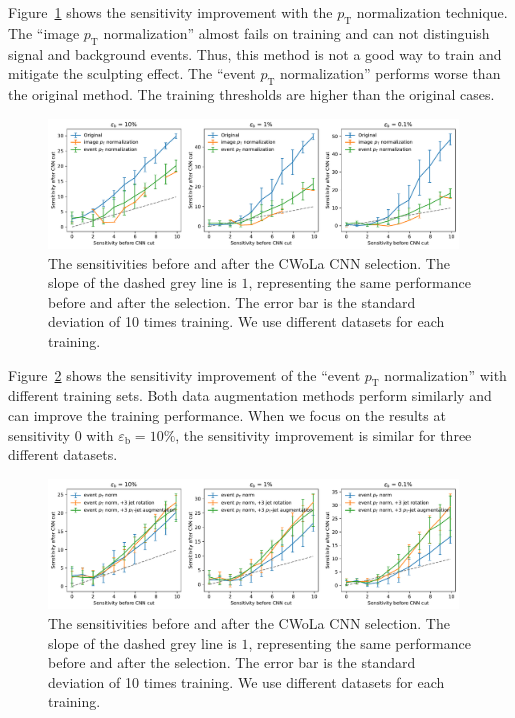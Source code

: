 \documentclass[12pt]{article}
\begin{document}
			 Figure~\ref{fig:sensitivity_improvement_background_subtraction_origin_pt_normalized} shows the sensitivity improvement with the $p_{\text{T}}$ normalization technique. The ``image $p_{\text{T}}$ normalization'' almost fails on training and can not distinguish signal and background events. Thus, this method is not a good way to train and mitigate the sculpting effect. The ``event $p_{\text{T}}$ normalization'' performs worse than the original method. The training thresholds are higher than the original cases.
			\begin{figure}[htpb]
				\centering
				\includegraphics[width=0.97\textwidth]{HVmodel_sensitivity_improvement_origin_pT_normalied.pdf}
				\caption{The sensitivities before and after the CWoLa CNN selection. The slope of the dashed grey line is $1$, representing the same performance before and after the selection. The error bar is the standard deviation of 10 times training. We use different datasets for each training.}
				\label{fig:sensitivity_improvement_background_subtraction_origin_pt_normalized}
			\end{figure}

			Figure~\ref{fig:sensitivity_improvement_background_subtraction_event_pt_normalized_origin_jet_aug_3_pt_jet_aug_3} shows the sensitivity improvement of the ``event $p_{\text{T}}$ normalization'' with different training sets. Both data augmentation methods perform similarly and can improve the training performance. When we focus on the results at sensitivity 0 with $\varepsilon_{\text{b}} = 10\%$, the sensitivity improvement is similar for three different datasets. 
			\begin{figure}[htpb]
				\centering
				\includegraphics[width=0.97\textwidth]{HVmodel_sensitivity_improvement_event_pT_normalied_origin_jet_aug_3_pt_jet_aug_3.pdf}
				\caption{The sensitivities before and after the CWoLa CNN selection. The slope of the dashed grey line is $1$, representing the same performance before and after the selection. The error bar is the standard deviation of 10 times training. We use different datasets for each training.}
				\label{fig:sensitivity_improvement_background_subtraction_event_pt_normalized_origin_jet_aug_3_pt_jet_aug_3}
			\end{figure}



\end{document}
